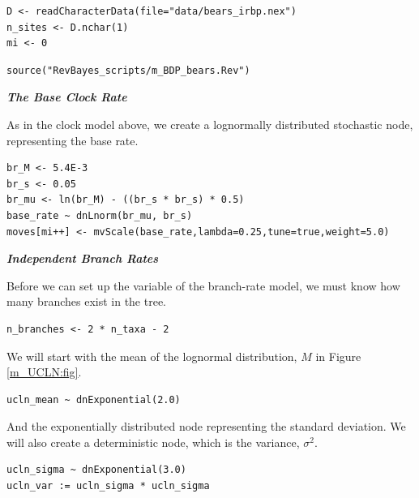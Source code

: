 {\tt \begin{snugshade*}
\begin{lstlisting}
D <- readCharacterData(file="data/bears_irbp.nex")
n_sites <- D.nchar(1)
mi <- 0
\end{lstlisting}
\end{snugshade*}}

{\tt \begin{snugshade*}
\begin{lstlisting}
source("RevBayes_scripts/m_BDP_bears.Rev")
\end{lstlisting}
\end{snugshade*}}

\textbf{\textit{The Base Clock Rate}}

As in the clock model above, we create a lognormally distributed stochastic node, representing the base rate.
{\tt \begin{snugshade*}
\begin{lstlisting}
br_M <- 5.4E-3
br_s <- 0.05
br_mu <- ln(br_M) - ((br_s * br_s) * 0.5)
base_rate ~ dnLnorm(br_mu, br_s)
moves[mi++] <- mvScale(base_rate,lambda=0.25,tune=true,weight=5.0)
\end{lstlisting}
\end{snugshade*}}

\textbf{\textit{Independent Branch Rates}}

Before we can set up the variable of the branch-rate model, we must know how many branches exist in the tree.
{\tt \begin{snugshade*}
\begin{lstlisting}
n_branches <- 2 * n_taxa - 2
\end{lstlisting}
\end{snugshade*}}

We will start with the mean of the lognormal distribution, $M$ in Figure \ref{m_UCLN:fig}.
{\tt \begin{snugshade*}
\begin{lstlisting}
ucln_mean ~ dnExponential(2.0)
\end{lstlisting}
\end{snugshade*}}

And the exponentially distributed node representing the standard deviation.
We will also create a deterministic node, which is the variance, $\sigma^2$.
{\tt \begin{snugshade*}
\begin{lstlisting}
ucln_sigma ~ dnExponential(3.0)
ucln_var := ucln_sigma * ucln_sigma
\end{lstlisting}
\end{snugshade*}}

